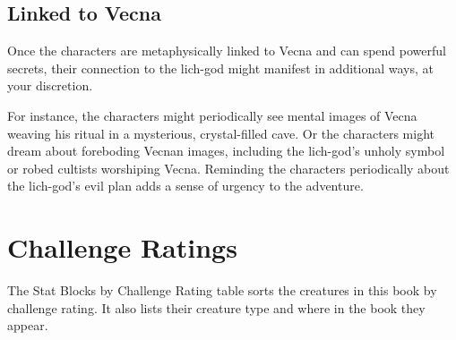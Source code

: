 \documentclass[10pt,a4paper,twoside,bg=print,twocolumn,openany,nodeprecatedcode]{dndbook}
\begin{document}
\subsection{Linked to Vecna}
Once the characters are metaphysically linked to Vecna and can spend powerful secrets, their connection to the lich-god might manifest in additional ways, at your discretion.

For instance, the characters might periodically see mental images of Vecna weaving his ritual in a mysterious, crystal-filled cave. Or the characters might dream about foreboding Vecnan images, including the lich-god's unholy symbol or robed cultists worshiping Vecna. Reminding the characters periodically about the lich-god's evil plan adds a sense of urgency to the adventure.

\section{Challenge Ratings}
The Stat Blocks by Challenge Rating table sorts the creatures in this book by challenge rating. It also lists their creature type and where in the book they appear.
\end{document}
